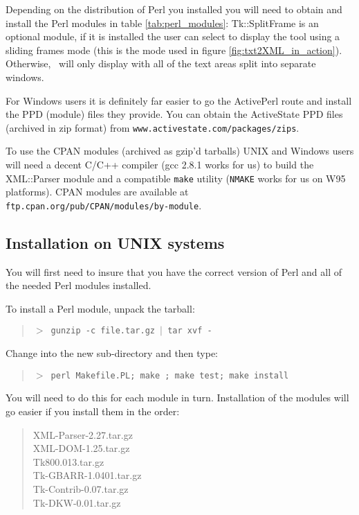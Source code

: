 Depending on the distribution of Perl you installed you will need to 
obtain and install the Perl modules in table \ref{tab:perl_modules}: 
Tk::SplitFrame is an optional module, if it is installed the user
can select to display the tool using a sliding frames mode (this 
is the mode used in figure \ref{fig:txt2XML_in_action}).
 Otherwise, \program\ will only display
with all of the text areas split into separate windows.

For Windows users it is definitely far easier to go the ActivePerl
route and install the PPD (module) files they provide. 
You can obtain the ActiveState PPD files (archived in zip format) from
{\tt www.activestate.com/packages/zips}. 

To use the CPAN modules (archived as gzip'd tarballs) 
UNIX and Windows users will need a decent C/C++ compiler (gcc 2.8.1 works
for us) to build the 
XML::Parser module and a compatible {\tt make} utility ({\tt NMAKE} 
works for us on W95 platforms). CPAN modules are available at 
{\tt ftp.cpan.org/pub/CPAN/modules/by-module}.

\subsection{Installation on UNIX systems}

You will first need to insure that 
you have the correct version of Perl and all of the needed Perl
modules installed.  

To install a Perl module, unpack the tarball:
\begin{quote}
{\tt $>$ gunzip -c file.tar.gz $|$ tar xvf - }
\end{quote}
Change into the new sub-directory and then type:
\begin{quote}
{\tt $>$ perl Makefile.PL; make ; make test; make install}
\end{quote}

You will need to do this for each module in turn. Installation of
the modules will go easier if you install them in the order:
\begin{quote}
XML-Parser-2.27.tar.gz \\
XML-DOM-1.25.tar.gz \\
Tk800.013.tar.gz \\
Tk-GBARR-1.0401.tar.gz  \\
Tk-Contrib-0.07.tar.gz  \\
Tk-DKW-0.01.tar.gz 
\end{quote}

